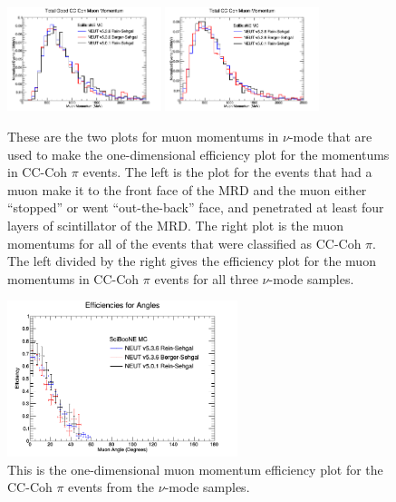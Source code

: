 \documentclass[11pt]{article}
\begin{document}
\begin{figure}[H]
\centering
\includegraphics[width=0.4\textwidth]{NMCombinedPlotsImages/15-NMCombinedPlots.png}
\includegraphics[width=0.4\textwidth]{NMCombinedPlotsImages/17-NMCombinedPlots.png}
\caption{These are the two plots for muon momentums in $\nu$-mode that are used to make the one-dimensional efficiency plot for the momentums in CC-Coh $\pi$ events. The left is the plot for the events that had a muon make it to the front face of the MRD and the muon either ``stopped'' or went ``out-the-back'' face, and penetrated at least four layers of scintillator of the MRD. The right plot is the muon momentums for all of the events that were classified as CC-Coh $\pi$. The left divided by the right gives the efficiency plot for the muon momentums in CC-Coh $\pi$ events for all three $\nu$-mode samples.}
\label{fig:app:NMCCCohMuonMom}
\end{figure}

\begin{figure}[H]
\centering
\includegraphics[width=0.6\textwidth]{NMCombinedPlotsImages/25-NMCombinedPlots.png}
\caption{This is the one-dimensional muon momentum efficiency plot for the CC-Coh $\pi$ events from the $\nu$-mode samples.}
\label{fig:app:NMCCCohMom1DEff}
\end{figure}
\end{document}
